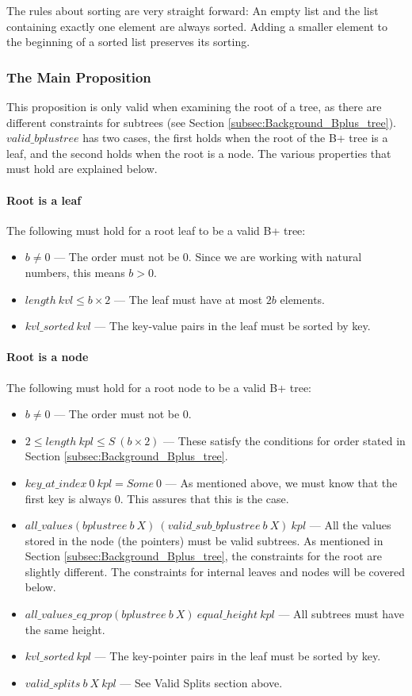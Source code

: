The rules about sorting are very straight forward: An empty list and the list containing exactly one element are always sorted. Adding a smaller element to the beginning of a sorted list preserves its sorting.

\subsubsection{The Main Proposition}
This proposition is only valid when examining the root of a tree, as there are different constraints for subtrees (see Section \ref{subsec:Background_Bplus_tree}). $valid\_bplustree$ has two cases, the first holds when the root of the B+ tree is a leaf, and the second holds when the root is a node. The various properties that must hold are explained below.

\paragraph{Root is a leaf}
The following must hold for a root leaf to be a valid B+ tree:
\label{valid_root_is_a_leaf}
\begin{itemize}
\item $b \neq 0$ --- The order must not be 0. Since we are working with natural numbers, this means $b > 0$.
\item $length\ kvl \leq b \times 2 $ --- The leaf must have at most $2b$ elements.
\item $kvl\_sorted\ kvl$ --- The key-value pairs in the leaf must be sorted by key.
\end{itemize}

\paragraph{Root is a node}
The following must hold for a root node to be a valid B+ tree:
\label{valid_root_is_a_node}
\begin{itemize}
\item $b \neq 0$ --- The order must not be 0.
\item $2 \leq length\ kpl \leq S\ (b \times 2)$ --- These satisfy the conditions for order stated in Section \ref{subsec:Background_Bplus_tree}.
\item $key\_at\_index\ 0\ kpl = Some\ 0$ --- As mentioned above, we must know that the first key is always 0. This assures that this is the case.
\item $all\_values (bplustree\ b\ X)\ (valid\_sub\_bplustree\ b\ X)\ kpl$ --- All the values stored in the node (the pointers) must be valid subtrees. As mentioned in Section \ref{subsec:Background_Bplus_tree}, the constraints for the root are slightly different. The constraints for internal leaves and nodes will be covered below.
\item $all\_values\_eq\_prop (bplustree\ b\ X)\ equal\_height\ kpl$ --- All subtrees must have the same height.
\item $kvl\_sorted\ kpl$ --- The key-pointer pairs in the leaf must be sorted by key.
\item $valid\_splits\ b \ X\ kpl$ --- See Valid Splits section above.
\end{itemize}

